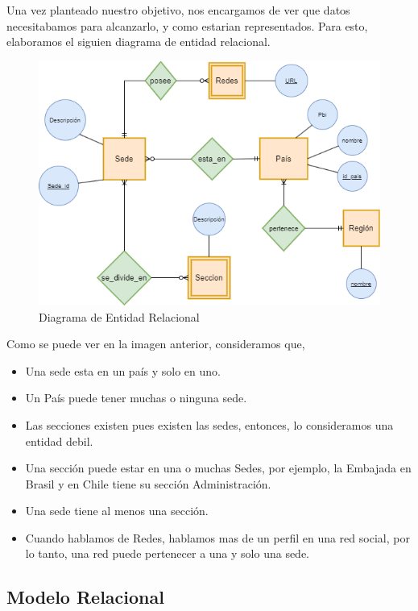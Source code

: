 \documentclass[10pt,a4paper]{article}
\begin{document}
Una vez planteado nuestro objetivo, nos encargamos de ver que datos necesitabamos para alcanzarlo, y como estarian representados. Para esto, elaboramos el siguien diagrama de entidad
relacional.  \vspace{0.2cm}

\begin{figure}[ht]
	\centering
	\includegraphics[width=1\textwidth]{DerFinal.png}
	\caption{Diagrama de Entidad Relacional}
	\label{fig:ejemplo}
\end{figure} \vspace{0.1cm}

Como se puede ver en la imagen anterior, consideramos que,

\begin{itemize}
	\item Una sede esta en un país y solo en uno.
	\item Un País puede tener muchas o ninguna sede.
	\item Las secciones existen pues existen las sedes, entonces, lo consideramos una entidad debil.
	\item Una sección puede estar en una o muchas Sedes, por ejemplo, la Embajada en Brasil y en Chile tiene su sección Administración.
	\item Una sede tiene al menos una sección.
	\item Cuando hablamos de Redes, hablamos mas de un perfil en una red social, por lo tanto, una red puede pertenecer a una y solo una sede.
\end{itemize}


\subsection{Modelo Relacional} \vspace{0.2cm}
\end{document}
